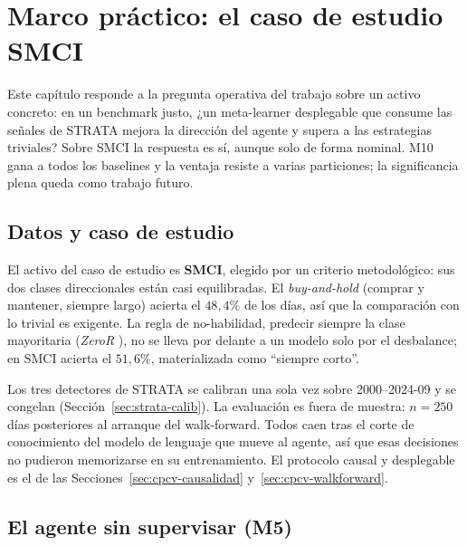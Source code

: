 \chapter{Marco práctico: el caso de estudio SMCI}
\label{cap:marco-practico}


Este capítulo responde a la pregunta operativa del trabajo sobre un activo concreto: en un benchmark justo, ¿un meta-learner desplegable que consume las señales de STRATA mejora la dirección del agente y supera a las estrategias triviales? Sobre SMCI la respuesta es sí, aunque solo de forma nominal. M10 gana a todos los baselines y la ventaja resiste a varias particiones; la significancia plena queda como trabajo futuro.

\section{Datos y caso de estudio}
\label{sec:datos}

El activo del caso de estudio es \textbf{SMCI}, elegido por un criterio metodológico: sus dos clases direccionales están casi equilibradas. El \emph{buy-and-hold} (comprar y mantener, siempre largo) acierta el $48{,}4\%$ de los días, así que la comparación con lo trivial es exigente. La regla de no-habilidad, predecir siempre la clase mayoritaria (\emph{ZeroR} \cite{witten2016datamining, kuhn2008caret}), no se lleva por delante a un modelo solo por el desbalance; en SMCI acierta el $51{,}6\%$, materializada como ``siempre corto''.

Los tres detectores de STRATA se calibran una sola vez sobre 2000--2024-09 y se congelan (Sección~\ref{sec:strata-calib}). La evaluación es fuera de muestra: $n = 250$ días posteriores al arranque del walk-forward. Todos caen tras el corte de conocimiento del modelo de lenguaje que mueve al agente, así que esas decisiones no pudieron memorizarse en su entrenamiento. El protocolo causal y desplegable es el de las Secciones~\ref{sec:cpcv-causalidad} y~\ref{sec:cpcv-walkforward}.

\section{El agente sin supervisar (M5)}
\label{sec:m5}

